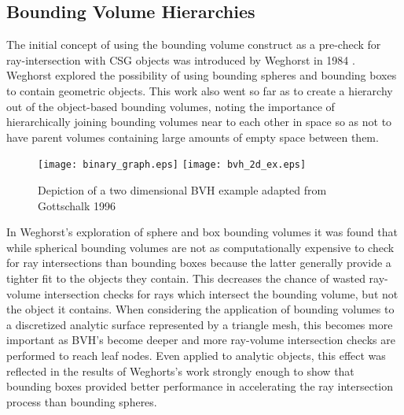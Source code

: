 \subsection{Bounding Volume Hierarchies}%
\label{subsec:BVH}
The initial concept of using the bounding volume construct as a pre-check for
ray-intersection with CSG objects was introduced by Weghorst in 1984
\cite{Weghorst_1984}. Weghorst explored the possibility of using bounding
spheres and bounding boxes to contain geometric objects. This work also went so
far as to create a hierarchy out of the object-based bounding volumes, noting the
importance of hierarchically joining bounding volumes near to each other in space
so as not to have parent volumes containing large amounts of empty space between them.

\begin{figure}[H]
  \centering
  \texttt{[image: binary\_graph.eps]}
  \texttt{[image: bvh\_2d\_ex.eps]}
  \caption{Depiction of a two dimensional BVH example adapted from Gottschalk 1996 \cite{Gottschalk_1996}}
  \label{fig:2D_bvh}
\end{figure}

In Weghorst's exploration of sphere and box bounding volumes it was found that
while spherical bounding volumes are not as computationally expensive to check
for ray intersections than bounding boxes because the latter generally provide a
tighter fit to the objects they contain. This decreases the chance of wasted
ray-volume intersection checks for rays which intersect the bounding volume, but
not the object it contains. When considering the application of bounding volumes
to a discretized analytic surface represented by a triangle mesh, this becomes
 more important as BVH's become deeper and more ray-volume intersection checks are performed to
reach leaf nodes. Even applied to analytic objects, this effect was reflected
in the results of Weghorts's work strongly enough to show that bounding boxes
provided better performance in accelerating the ray intersection process than
bounding spheres.

